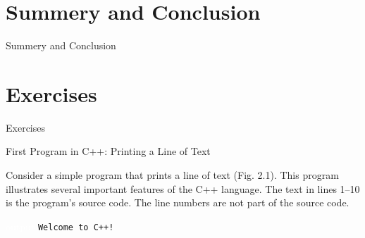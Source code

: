 \documentclass[10pt]{beamer}
\begin{document}
\section{Summery and Conclusion}

\begin{frame}{Summery and Conclusion}
	\lipsum[2]
\end{frame}


\section{Exercises}

\begin{frame}{Exercises}
	\lipsum[2]
\end{frame}

\begin{frame}{\small First Program in C++: Printing a Line of Text}
	
	Consider a simple program that prints a line of text (Fig. 2.1). This program illustrates several important features of the C++ language. The text in lines 1–10 is the program’s source code. The line numbers are not part of the source code.
	
	
	
	\begin{block}{\textcolor{white}{output}}
		\texttt{\small Welcome to C++!}
	\end{block}
	
\end{frame}
\end{document}
